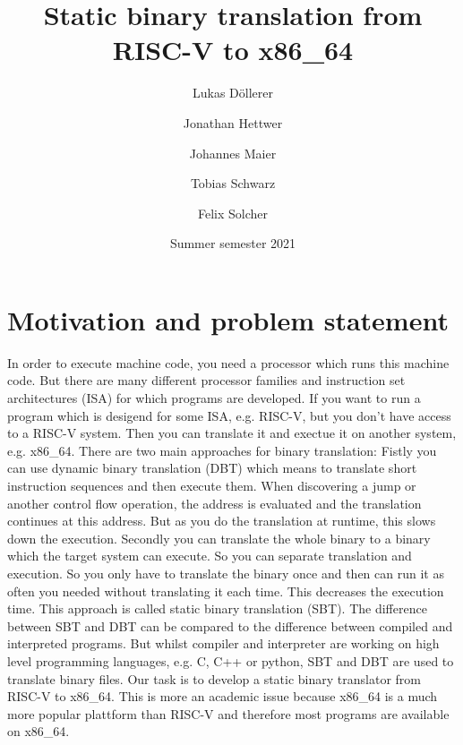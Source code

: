 \documentclass[course=eragp]{aspdoc}
\author{Lukas Döllerer \and Jonathan Hettwer \and Johannes Maier \and Tobias Schwarz \and Felix Solcher}
\date{Summer semester 2021}
\title{Static binary translation from RISC-V to x86\_64}
\begin{document}
\maketitle

\tableofcontents

\section{Motivation and problem statement}


In order to execute machine code, you need a processor which runs this machine code.
But there are many different processor families and instruction set architectures (ISA)
for which programs are developed. If you want to run a program which is desigend for
some ISA, e.g. RISC-V, but you don't have access to a RISC-V system. Then you can
translate it and exectue it on another system, e.g. x86\_64. There are two main approaches
for binary translation: \newline
Fistly you can use dynamic binary translation (DBT) which means to translate short
instruction sequences and then execute them. When discovering a jump or another
control flow operation, the address is evaluated and the translation continues at this
address. But as you do the translation at runtime, this slows down the execution. \newline
Secondly you can translate the whole binary to a binary which the target system can
execute. So you can separate translation and execution. So you only have to translate
the binary once and then can run it as often you needed without translating it each time.
This decreases the execution time. This approach is called static binary translation (SBT).\newline
The difference between SBT and DBT can be compared to the difference between compiled
and interpreted programs. But whilst compiler and interpreter are working on
high level programming languages, e.g. C, C++ or python, SBT and DBT are used to translate
binary files.\newline
Our task is to develop a static binary translator from RISC-V to x86\_64. This is more an
academic issue because x86\_64 is a much more popular plattform than RISC-V and
therefore most programs are available on x86\_64.
\end{document}

